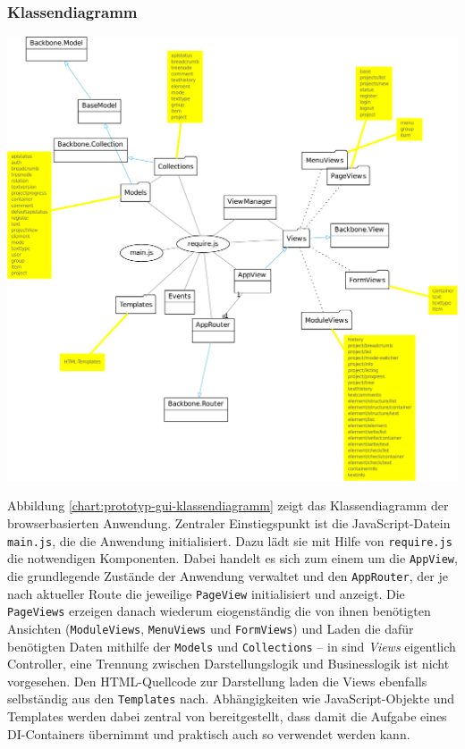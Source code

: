 \subsubsection{Klassendiagramm}

\begin{center}
\includegraphics[width=\textwidth]{media/prototyp-gui-klassendiagramm.pdf}
\label{chart:prototyp-gui-klassendiagramm}
\end{center}

Abbildung \ref{chart:prototyp-gui-klassendiagramm} zeigt das Klassendiagramm der browserbasierten Anwendung. Zentraler Einstiegspunkt ist die JavaScript-Datein \texttt{main.js}, die die Anwendung initialisiert. Dazu lädt sie mit Hilfe von \texttt{require.js} die notwendigen Komponenten. Dabei handelt es sich zum einem um die \texttt{AppView}, die grundlegende Zustände der Anwendung verwaltet und den \texttt{AppRouter}, der je nach aktueller Route die jeweilige \texttt{PageView} initialisiert und anzeigt. Die \texttt{PageViews} erzeigen danach wiederum eiogenständig die von ihnen benötigten Ansichten (\texttt{ModuleViews}, \texttt{MenuViews} und \texttt{FormViews}) und Laden die dafür benötigten Daten mithilfe der \texttt{Models} und \texttt{Collections} -- in  sind \emph{Views} eigentlich Controller, eine Trennung zwischen Darstellungslogik und Businesslogik ist nicht vorgesehen. Den HTML-Quellcode zur Darstellung laden die Views ebenfalls selbständig aus den \texttt{Templates} nach. Abhängigkeiten wie JavaScript-Objekte und Templates werden dabei zentral von  bereitgestellt, dass damit die Aufgabe eines DI-Containers übernimmt und praktisch auch so verwendet werden kann.

